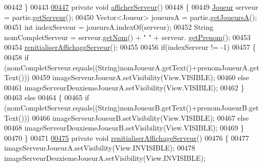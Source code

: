 \begin{DoxyCode}
00442     \}
00443 
\hyperlink{classcom_1_1example_1_1area_1_1_i_h_m_gestion_partie_adf8fc8de224da80f542675cbb4c2e364}{00447}     \textcolor{keyword}{private} \textcolor{keywordtype}{void} \hyperlink{classcom_1_1example_1_1area_1_1_i_h_m_gestion_partie_adf8fc8de224da80f542675cbb4c2e364}{afficherServeur}()
00448     \{
00449          \hyperlink{classcom_1_1example_1_1area_1_1_joueur}{Joueur} serveur = partie.\hyperlink{classcom_1_1example_1_1area_1_1_partie_a34f75da57f51b710fccbce4aafda28d4}{getServeur}();
00450          Vector<Joueur> joueursA = partie.\hyperlink{classcom_1_1example_1_1area_1_1_partie_a0f944de317206d9b99f9ffc7146a43ef}{getJoueursA}();
00451          \textcolor{keywordtype}{int} indexServeur = joueursA.indexOf(serveur);
00452          String nomCompletServeur = serveur.\hyperlink{classcom_1_1example_1_1area_1_1_joueur_a4e43a9187363501204af7b2f2c84a9a4}{getNom}() + \textcolor{stringliteral}{" "} + serveur.
      \hyperlink{classcom_1_1example_1_1area_1_1_joueur_ac2cd099ccfc34c48fbabde5649514a27}{getPrenom}();
00453 
00454         \hyperlink{classcom_1_1example_1_1area_1_1_i_h_m_gestion_partie_a4f5930a69896d1d75add34badfb168eb}{renitialiserAffichageServeur}();
00455 
00456         \textcolor{keywordflow}{if}(indexServeur != -1)
00457          \{
00458             \textcolor{keywordflow}{if} (nomCompletServeur.equals((String)nomJoueurA.getText()+prenomJoueurA.getText()))
00459                 imageServeurJoueurA.setVisibility(View.VISIBLE);
00460             \textcolor{keywordflow}{else}
00461                 imageServeurDeuxiemeJoueurA.setVisibility(View.VISIBLE);
00462          \}
00463          \textcolor{keywordflow}{else}
00464          \{
00465              \textcolor{keywordflow}{if} (nomCompletServeur.equals((String)nomJoueurB.getText()+prenomJoueurB.getText()))
00466                  imageServeurJoueurB.setVisibility(View.VISIBLE);
00467              \textcolor{keywordflow}{else}
00468                  imageServeurDeuxiemeJoueurB.setVisibility(View.VISIBLE);
00469          \}
00470     \}
00471 
\hyperlink{classcom_1_1example_1_1area_1_1_i_h_m_gestion_partie_a4f5930a69896d1d75add34badfb168eb}{00475}     \textcolor{keyword}{private} \textcolor{keywordtype}{void} \hyperlink{classcom_1_1example_1_1area_1_1_i_h_m_gestion_partie_a4f5930a69896d1d75add34badfb168eb}{renitialiserAffichageServeur}()
00476     \{
00477         imageServeurJoueurA.setVisibility(View.INVISIBLE);
00478         imageServeurDeuxiemeJoueurA.setVisibility(View.INVISIBLE);

\end{DoxyCode}
